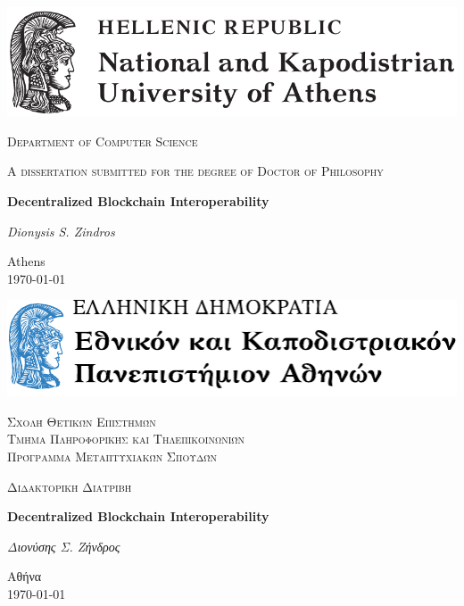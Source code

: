 \begin{titlepage}
  \centering
  \includegraphics[width=\textwidth]{chapters/preface/figures/uoa.pdf}\par\vspace{1cm}
  {\scshape\Large Department of Computer Science\par}
  \vspace{1cm}
  {\scshape A dissertation submitted for the degree of Doctor of Philosophy\par}
  \vspace{1cm}
  {\huge\bfseries Decentralized Blockchain Interoperability\par}
  \vspace{2cm}
  {\Large\itshape Dionysis \ifuniversity S. \fi Zindros\par}
	\vfill
	{\large Athens\\\today\par}
\end{titlepage}

\ifuniversity
\begin{titlepage}
  \centering
  \includegraphics[width=\textwidth]{chapters/preface/figures/uoa-greek.pdf}\par\vspace{1cm}
  {\scshape\Large
  \ifuniversity
  Σχολή Θετικών Επιστημών\\
  \fi
  Τμήμα Πληροφορικής και Τηλεπικοινωνιών
  \ifuniversity
  \\
  Πρόγραμμα Μεταπτυχιακών Σπουδών
  \fi
  \par}
  \vspace{1cm}
  {\scshape Διδακτορική Διατριβή\par}
  \vspace{1cm}
  {\huge\bfseries Decentralized Blockchain Interoperability\par}
  \vspace{2cm}
  {\Large\itshape Διονύσης \ifuniversity Σ. \fi Ζήνδρος\par}
	\vfill
	{\large Αθήνα\\\today\par}
\end{titlepage}
\fi
